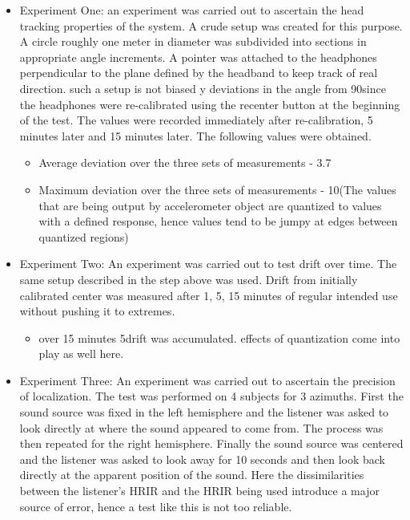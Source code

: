 \documentclass[a4paper,12pt,oneside]{article}
\begin{document}
\begin{itemize}
\item Experiment One: an experiment was carried out to ascertain the head tracking properties of the system. A crude setup was created for this purpose. A circle roughly one meter in diameter was subdivided into sections in appropriate angle increments. A pointer was attached to the headphones perpendicular to the plane defined by the headband to keep track of real direction. such a setup is not biased y deviations in the angle from 90\degree since the headphones were re-calibrated using the recenter button at the beginning  of the test. The values were recorded immediately after re-calibration, 5 minutes later and 15 minutes later. The following values were obtained.

\begin {center}
\begin {itemize}

\item Average deviation over the three sets of measurements - 3.7\degree 
\item Maximum deviation over the three sets of measurements - 10\degree  (The values that are being output by accelerometer object are quantized to values with a defined response, hence values tend to be jumpy at edges between quantized regions)

\end{itemize}
\end {center}

\item Experiment Two: An experiment was carried out to test drift over time. The same setup described in the step above was used. Drift from initially calibrated center was measured after 1, 5, 15 minutes of regular intended use without pushing it to extremes.\\

\begin{center}
\begin {itemize}

\item over 15 minutes 5\degree  drift was accumulated. effects of quantization come into play as well here.

\end {itemize}
\end{center}

\item Experiment Three: An experiment was carried out to ascertain the precision of localization. The test was performed on 4 subjects for 3 azimuths. First the sound source was fixed in the left hemisphere and the listener was asked to look directly at where the sound appeared to come from. The process was then repeated for the right hemisphere. Finally the sound source was centered and the listener was asked to look away for 10 seconds and then look back directly at the apparent position of the sound. Here the dissimilarities between the listener's HRIR and the HRIR being used introduce a major source of error, hence a test like this is not too reliable.


\end{itemize}
\end{document}
